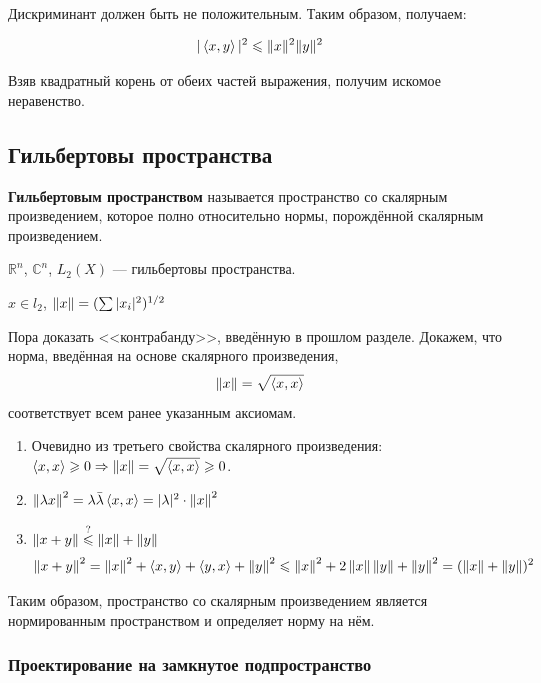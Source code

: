 \documentclass[12pt]{article}
\begin{document}
			Дискриминант должен быть не положительным. Таким образом, получаем:

			$$|\left\langle x, y \right\rangle|^2 \leqslant \|x\|^2 \|y\|^2$$

			Взяв квадратный корень от обеих частей выражения, получим искомое неравенство.

	\subsection{Гильбертовы пространства}

		\begin{defi}
			\textbf{Гильбертовым пространством} называется пространство со скалярным произведением, которое полно относительно нормы, 
			порождённой  скалярным произведением.
		\end{defi}
	
		\example $\mathbb{R}^n$, $\mathbb{C}^n$, $L_2(X)$ --- гильбертовы пространства.

		\todo{Зачем это здесь?}
		\begin{defi}
			$x \in l_2$, $\left\| x \right\| = (\sum{|x_i|^2})^{1/2}$ 
		\end{defi}


		Пора доказать <<контрабанду>>, введённую в прошлом разделе. Докажем, что норма, введённая на основе скалярного произведения, 
		$$\left\| x \right\| = \sqrt{\left\langle x, x \right\rangle}$$
		соответствует всем ранее указанным аксиомам.

		\begin{enumerate}
		\item Очевидно из третьего свойства скалярного произведения: $\left\langle x, x \right\rangle \geqslant 0 \Rightarrow \left\| x \right\| = \sqrt{\left\langle x, x \right\rangle} \geqslant 0$.
		\item $\left\| \lambda x \right\|^2 = \lambda \bar{\lambda} \left\langle x, x \right\rangle = | \lambda |^2 \cdot \left\| x \right\|^2$
		\item $\left\| x+y \right\| \overset{?}{\leqslant} \left\| x \right\| + \left\| y \right\|$
			  $$\left\| x + y \right\|^2 = \left\| x \right\|^2 + \left\langle x, y \right\rangle + \left\langle y, x \right\rangle + \left\| y \right\|^2 \leqslant \left\| x \right\|^2 + 2 \left\| x \right\| \left\| y \right\| + \left\| y \right\|^2
				= (\left\| x \right\| + \left\| y \right\|)^2
			  $$
		\end{enumerate}
		Таким образом, пространство со скалярным произведением является нормированным пространством и определяет норму на нём.

		\subsubsection{Проектирование на замкнутое подпространство}
\end{document}
